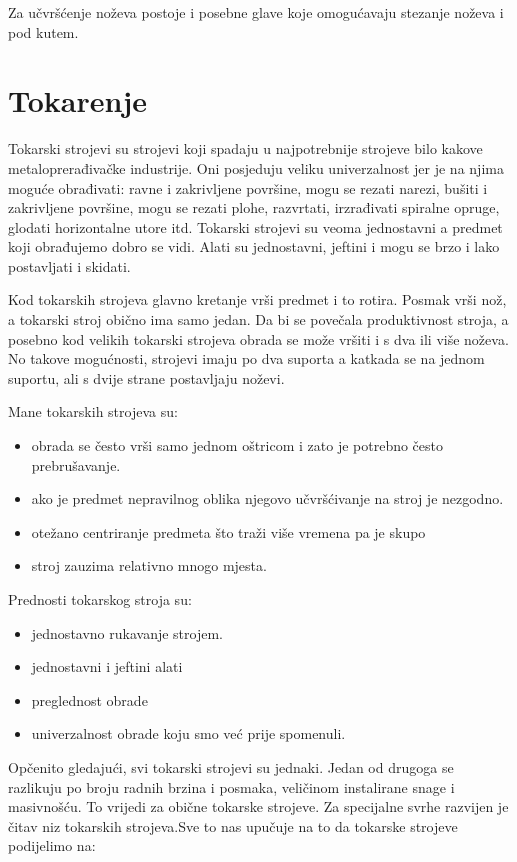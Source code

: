 \documentclass[a4paper,12pt]{article}
\numberwithin{figure}{section}
\begin{document}
\FloatBarrier
Za učvršćenje noževa postoje i posebne glave koje omogućavaju stezanje noževa i pod kutem.
\section{Tokarenje}
Tokarski strojevi su strojevi koji spadaju u najpotrebnije strojeve bilo kakove metaloprerađivačke industrije. Oni posjeduju veliku univerzalnost jer je na njima moguće obrađivati: ravne i zakrivljene površine, mogu se rezati narezi, bušiti i zakrivljene površine, mogu se rezati plohe, razvrtati, irzrađivati spiralne opruge, glodati horizontalne utore itd. Tokarski strojevi su veoma jednostavni a predmet koji obrađujemo dobro se vidi. Alati su jednostavni, jeftini i mogu se brzo i lako postavljati i skidati.\par
Kod tokarskih strojeva glavno kretanje vrši predmet i to rotira. Posmak vrši nož, a tokarski stroj obično ima samo jedan. Da bi se povečala produktivnost stroja, a posebno kod velikih tokarski strojeva obrada se može vršiti i s dva ili više noževa. No takove mogućnosti, strojevi imaju po dva suporta a katkada se na jednom suportu, ali s dvije strane postavljaju noževi.\par 
Mane tokarskih strojeva su:
\begin{itemize}
\item obrada se često vrši samo jednom oštricom i zato je potrebno često prebrušavanje.
\item ako je predmet nepravilnog oblika njegovo učvršćivanje na stroj je nezgodno.
\item otežano centriranje predmeta što traži više vremena pa je skupo
\item stroj zauzima relativno mnogo mjesta.
\end{itemize}
\par
Prednosti tokarskog stroja su:
\begin{itemize}
\item jednostavno rukavanje strojem.
\item jednostavni i jeftini alati
\item preglednost obrade
\item univerzalnost obrade koju smo već prije spomenuli.
\end{itemize}
\par
Opčenito gledajući, svi tokarski strojevi su jednaki. Jedan od drugoga se razlikuju po broju radnih brzina i posmaka, veličinom instalirane snage i masivnošću. To vrijedi za obične tokarske strojeve. Za specijalne svrhe razvijen je čitav niz tokarskih strojeva.Sve to nas upučuje na to da tokarske strojeve podijelimo na:
\end{document}
